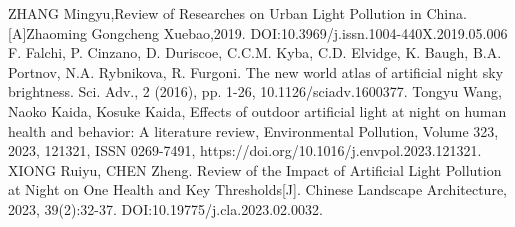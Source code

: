 \begin{thebibliography}{99}
     ZHANG Mingyu,Review of Researches on Urban Light Pollution in China.
    [A]Zhaoming Gongcheng Xuebao,2019.
    DOI:10.3969/j.issn.1004-440X.2019.05.006
     F. Falchi, P. Cinzano, D. Duriscoe, C.C.M. Kyba, C.D. Elvidge, K. Baugh, B.A. Portnov, N.A. Rybnikova, R. Furgoni. 
    The new world atlas of artificial night sky brightness. 
    Sci. Adv., 2 (2016), pp. 1-26, 10.1126/sciadv.1600377.
     Tongyu Wang, Naoko Kaida, Kosuke Kaida,
    Effects of outdoor artificial light at night on human health and behavior: A literature review,
    Environmental Pollution,
    Volume 323,
    2023,
    121321,
    ISSN 0269-7491,
    https://doi.org/10.1016/j.envpol.2023.121321.
     XIONG Ruiyu, CHEN Zheng. Review of the Impact of Artificial Light Pollution at Night on One Health and Key Thresholds[J]. 
    Chinese Landscape Architecture, 2023, 39(2):32-37. DOI:10.19775/j.cla.2023.02.0032.

\end{thebibliography}